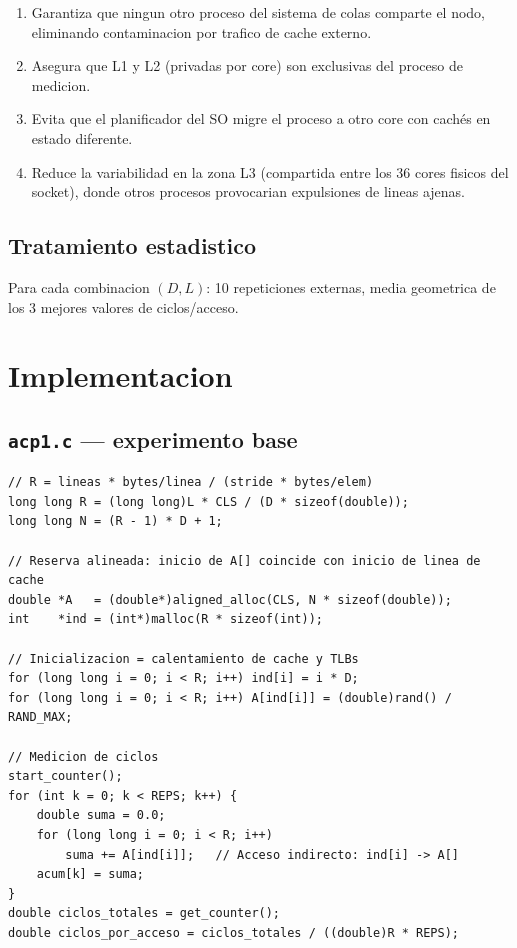 \documentclass[12pt,a4paper]{article}
\begin{document}
\begin{enumerate}[leftmargin=1.5em]
  \item Garantiza que ningun otro proceso del sistema de colas comparte el nodo, eliminando contaminacion por trafico de cache externo.
  \item Asegura que L1 y L2 (privadas por core) son exclusivas del proceso de medicion.
  \item Evita que el planificador del SO migre el proceso a otro core con cachés en estado diferente.
  \item Reduce la variabilidad en la zona L3 (compartida entre los 36 cores fisicos del socket), donde otros procesos provocarian expulsiones de lineas ajenas.
\end{enumerate}

\subsection{Tratamiento estadistico}

Para cada combinacion $(D, L)$: 10 repeticiones externas, media geometrica de los 3 mejores valores de ciclos/acceso.

\section{Implementacion}

\subsection{\texttt{acp1.c} --- experimento base}

\begin{lstlisting}[caption={Calculo de R y bucle de medicion (acp1.c)}, label=lst:acp1]
// R = lineas * bytes/linea / (stride * bytes/elem)
long long R = (long long)L * CLS / (D * sizeof(double));
long long N = (R - 1) * D + 1;

// Reserva alineada: inicio de A[] coincide con inicio de linea de cache
double *A   = (double*)aligned_alloc(CLS, N * sizeof(double));
int    *ind = (int*)malloc(R * sizeof(int));

// Inicializacion = calentamiento de cache y TLBs
for (long long i = 0; i < R; i++) ind[i] = i * D;
for (long long i = 0; i < R; i++) A[ind[i]] = (double)rand() / RAND_MAX;

// Medicion de ciclos
start_counter();
for (int k = 0; k < REPS; k++) {
    double suma = 0.0;
    for (long long i = 0; i < R; i++)
        suma += A[ind[i]];   // Acceso indirecto: ind[i] -> A[]
    acum[k] = suma;
}
double ciclos_totales = get_counter();
double ciclos_por_acceso = ciclos_totales / ((double)R * REPS);
\end{lstlisting}
\end{document}
